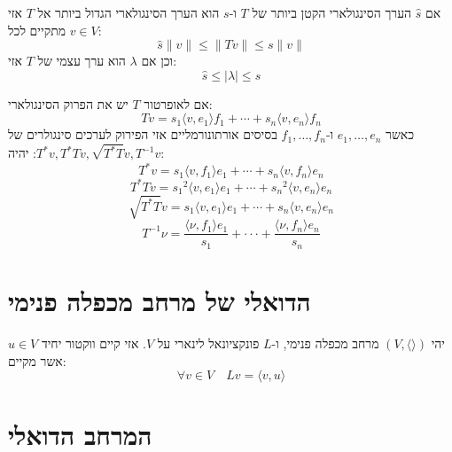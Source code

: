 \documentclass{tstextbook}
\begin{document}
\begin{proposition}
אם \(\hat{s}\) הערך הסינגולארי הקטן ביותר של \(T\) ו-\(s\) הוא הערך הסינגולארי הגדול ביותר אל \(T\) אזי מתקיים לכל \(v \in V\):
$$\hat{s}\lVert v \rVert \leq \lVert Tv \rVert \leq s\lVert v \rVert $$
וכן אם \(\lambda\) הוא ערך עצמי של \(T\) אזי:
$$\hat{s}\leq \left\lvert  \lambda  \right\rvert \leq s$$

\end{proposition}
\begin{proposition}
אם לאופרטור \(T\) יש את הפרוק הסינגולארי:
$$T v=s_{1}\langle v,e_{1}\rangle f_{1}+\cdots+s_{n}\langle v,e_{n}\rangle f_{n}$$
כאשר \(e_{1},\dots,e_{n}\) ו-\(f_{1},\dots,f_{n}\) בסיסים אורתונורמליים אזי הפירוק לערכים סינגולרים של \(T^{*}v,T^{*}Tv,\sqrt{ T^{*}T }v,T^{-1}v\): יהיה:
$$T^{*}v=s_{1}\langle v,f_{1}\rangle e_{1}+\cdots+s_{n}\langle v,f_{n}\rangle e_{n}$$$$T^{*}T v={s_{1}}^{2}\langle v,e_{1}\rangle e_{1}+\cdots+{s_{n}}^{2}\langle v,e_{n}\rangle e_{n}$$$${\sqrt{T^{*}T}}v=s_{1}\langle v,e_{1}\rangle e_{1}+\cdots+s_{n}\langle v,e_{n}\rangle e_{n}$$$$T^{-1}\nu=\frac{\langle\nu,f_{1}\rangle e_{1}}{s_{1}}+\cdot\cdot\cdot+\frac{\langle\nu,f_{n}\rangle e_{n}}{s_{n}}$$

\end{proposition}

\section{הדואלי של מרחב מכפלה פנימי}

\begin{theorem}
יהי \(\left( V,\langle  \rangle \right)\) מרחב מכפלה פנימי, ו-\(L\) פונקציונאל לינארי על \(V\). אזי קיים ווקטור יחיד \(u \in V\) אשר מקיים:
$$\forall v \in V\quad Lv = \langle v,u \rangle $$

\end{theorem}
\section{המרחב הדואלי}
\end{document}

